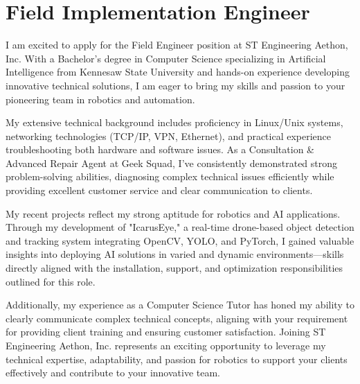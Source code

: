 \section{Field Implementation Engineer}

I am excited to apply for the Field Engineer 
position at ST Engineering Aethon, Inc. With a Bachelor’s degree 
in Computer Science specializing in Artificial Intelligence from 
Kennesaw State University and hands-on experience developing 
innovative technical solutions, I am eager to bring my skills and 
passion to your pioneering team in robotics and automation. \par

My extensive technical background includes proficiency in Linux/Unix systems, 
networking technologies (TCP/IP, VPN, Ethernet), and practical experience 
troubleshooting both hardware and software issues. As a Consultation \& 
Advanced Repair Agent at Geek Squad, I've consistently demonstrated strong 
problem-solving abilities, diagnosing complex technical issues efficiently 
while providing excellent customer service and clear communication to clients. \par

My recent projects reflect my strong aptitude for robotics and AI applications. 
Through my development of "IcarusEye," a real-time drone-based object detection 
and tracking system integrating OpenCV, YOLO, and PyTorch, I gained valuable insights 
into deploying AI solutions in varied and dynamic environments—skills directly aligned 
with the installation, support, and optimization responsibilities outlined for this role. \par

Additionally, my experience as a Computer Science Tutor has honed my ability to 
clearly communicate complex technical concepts, aligning with your requirement for 
providing client training and ensuring customer satisfaction. 
Joining ST Engineering Aethon, Inc. represents an exciting opportunity to leverage my 
technical expertise, adaptability, and passion for robotics to support your clients 
effectively and contribute to your innovative team. \par

